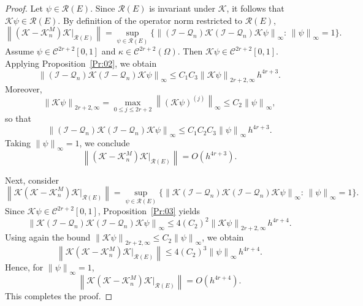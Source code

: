 \documentclass[]{interact}
\theoremstyle{plain}%
\theoremstyle{definition}
\theoremstyle{remark}
\newcommand{\norm}[1]{\left\lVert #1\right\rVert}
\begin{document}
\begin{proof}
	Let $\psi \in \mathcal{R}(E)$. Since $\mathcal{R}(E)$ is invariant under 
	$\mathcal{K}$, it follows that $\mathcal{K}\psi \in \mathcal{R}(E)$. 
	By definition of the operator norm restricted to $\mathcal{R}(E)$,
	\[
	\norm{(\mathcal{K} - \mathcal{K}_n^M)\mathcal{K} 
		\big|_{\mathcal{R}(E)}}
	=
	\sup_{\psi \in \mathcal{R}(E)}
	\Big\{
	\norm{(\mathcal{I}-\mathcal{Q}_n)\mathcal{K}
		(\mathcal{I}-\mathcal{Q}_n)\mathcal{K}\psi}_\infty
	:\, \norm{\psi}_\infty = 1
	\Big\}.
	\]
	Assume $\psi \in \mathcal{C}^{2r+2}[0,1]$ and  $\kappa \in \mathcal{C}^{2r+2}(\Omega)$. Then $\mathcal{K}\psi \in \mathcal{C}^{2r+2}[0,1]$. 
	Applying Proposition~\ref{Pr:02}, we obtain
	\[
	\norm{(\mathcal{I}-\mathcal{Q}_n)\mathcal{K}
		(\mathcal{I}-\mathcal{Q}_n)\mathcal{K}\psi}_\infty
	\le
	C_1 C_3\norm{\mathcal{K}\psi}_{2r+2,\infty} \, h^{4r+3}.
	\]
	Moreover,
	\[
	\norm{\mathcal{K}\psi}_{2r+2,\infty}
	=
	\max_{0 \le j \le 2r+2}
	\norm{(\mathcal{K}\psi)^{(j)}}_\infty
	\le
	C_2 \norm{\psi}_\infty,
	\]
	so that
	\[
	\norm{(\mathcal{I}-\mathcal{Q}_n)\mathcal{K}
		(\mathcal{I}-\mathcal{Q}_n)\mathcal{K}\psi}_\infty
	\le
	C_1 C_2 C_3\norm{\psi}_\infty \, h^{4r+3}.
	\]
	Taking $\norm{\psi}_\infty = 1$, we conclude
	\[
	\norm{(\mathcal{K} - \mathcal{K}_n^M)\mathcal{K} 
		\big|_{\mathcal{R}(E)}}
	=
	O\left(h^{4r+3}\right).
	\]
	
	Next, consider
	\[
	\norm{\mathcal{K}(\mathcal{K} - \mathcal{K}_n^M)\mathcal{K}
		\big|_{\mathcal{R}(E)}}
	=
	\sup_{\psi \in \mathcal{R}(E)}
	\Big\{
	\norm{\mathcal{K}(\mathcal{I}-\mathcal{Q}_n)\mathcal{K}
		(\mathcal{I}-\mathcal{Q}_n)\mathcal{K}\psi}_\infty
	:\, \norm{\psi}_\infty = 1\Big\}.
	\]
	Since $\mathcal{K}\psi \in \mathcal{C}^{2r+2}[0,1]$, Proposition~\ref{Pr:03} yields
	\[
	\norm{\mathcal{K}(\mathcal{I}-\mathcal{Q}_n)\mathcal{K}
		(\mathcal{I}-\mathcal{Q}_n)\mathcal{K}\psi}_\infty
	\le
	4(C_2)^2 \norm{\mathcal{K}\psi}_{2r+2,\infty} \, h^{4r+4}.
	\]
	Using again the bound 
	$\norm{\mathcal{K}\psi}_{2r+2,\infty} \le C_2 \norm{\psi}_\infty$, 
	we obtain
	\[
	\norm{\mathcal{K}(\mathcal{K} - \mathcal{K}_n^M)\mathcal{K}
		\big|_{\mathcal{R}(E)}}
	\le
	4(C_2)^3 \norm{\psi}_\infty \, h^{4r+4}.
	\]
	Hence, for $\norm{\psi}_\infty = 1$,
	\[
	\norm{\mathcal{K}(\mathcal{K} - \mathcal{K}_n^M)\mathcal{K}
		\big|_{\mathcal{R}(E)}}
	=
	O\left(h^{4r+4}\right).
	\]
	This completes the proof.
\end{proof}
\end{document}
